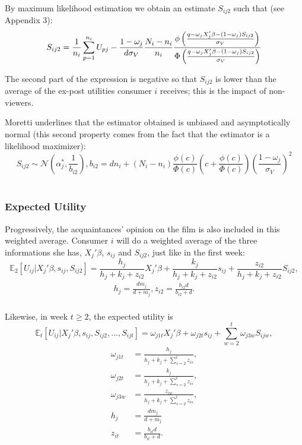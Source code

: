 	By maximum likelihood estimation we obtain an estimate $S_{i j 2}$ such that (see Appendix 3):
	\begin{equation}
	S_{i j 2}=\frac{1}{n_{i}}\sum_{p=1}^{n_{i}}U_{p j}-\frac{1-\omega_{j}}{d\sigma_{V}}\frac{N_{i}-n_{i}}{n_{i}}\frac{\phi\left(\frac{q-\omega_{j}X'_{j}\beta-(1-\omega_{j})S_{i j 2}}{\sigma_{V}}\right)}{\Phi\left(\frac{q-\omega_{j}X'_{j}\beta-(1-\omega_{j})S_{i j 2}}{\sigma_{V}}\right)}\\
	\end{equation}
	
	The second part of the expression is negative so that $S_{i j 2}$ is lower than the average of the ex-post utilities consumer $i$ receives; this is the impact of non-viewers.
	
	Moretti underlines that the estimator obtained is unbiased and asymptotically normal (this second property comes from the fact that the estimator is a likelihood maximizer): 
	\begin{equation}
	S_{i j 2}\sim\mathcal{N}(\alpha_{j}^{*}, \frac{1}{b_{i 2}}) , b_{i 2}=dn_{i}+(N_{i}-n_{i})\frac{\phi(c)}{\Phi(c)}\left(c+\frac{\phi(c)}{\Phi(c)}\right)\left(\frac{1-\omega_{j}}{\sigma_{V}}\right)^{2}
	\end{equation}\\
	
	\subsubsection{Expected Utility}
	Progressively, the acquaintances' opinion on the film is also included in this weighted average.
	Consumer $i$ will do a weighted average of the three informations she has, $X_{j}'\beta$, $s_{i j}$ and $S_{i j 2}$, just like in the first week:
	\begin{equation}
	\mathbb{E}_2[U_{i j}|X_{j}'\beta, s_{i j}, S_{i j 2}]=\frac{h_{j}}{h_{j}+k_{j}+z_{i 2}} X_{j}'\beta+\frac{k_{j}}{h_{j}+k_{j}+z_{i 2}}s_{i j}+\frac{z_{i 2}}{h_{j}+k_{j}+z_{i 2}}S_{i j 2}, 
	\end{equation}
	\begin{align*}
	h_{j}=\frac{d m_{j}}{d+m_{j}}, z_{i 2}=\frac{b_{i 2}d}{b_{i 2}+d}.\\
	\end{align*}

	Likewise, in week $t\geq2$, the expected utility is
	\begin{equation}
	\mathbb{E}_t[U_{i j}|X_{j}'\beta, s_{i j}, S_{i j 2}, ..., S_{i j t}]=\omega_{j 1 t}X_{j}'\beta +\omega_{j 2 t}s_{i j}+\sum_{w=2}^{t}\omega_{j 3 w}S_{i j w}, 
	\end{equation}
	\begin{align*}
		\omega_{j 1 t}&=\frac{h_{j}}{h_{j}+k_{j}+\sum_{s=2}^{t}z_{i s}},\\
		\omega_{j 2 t}&=\frac{k_{j}}{h_{j}+k_{j}+\sum_{s=2}^{t}z_{i s}},\\
		\omega_{j 3 w}&=\frac{z_{i w}}{h_{j}+k_{j}+\sum_{s=2}^{t}z_{i s}},\\
		h_{j}&=\frac{d m_{j}}{d+m_{j}}\\
		z_{i t}&=\frac{b_{i t}d}{b_{i t}+d}.
	\end{align*}
	
